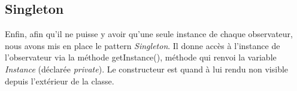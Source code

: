 \subsection{Singleton}

Enfin, afin qu’il ne puisse y avoir qu'une seule instance de chaque observateur, nous avons mis en place le pattern \emph{Singleton}. Il donne accès à l'instance de l'observateur via la méthode getInstance(), méthode qui renvoi la variable \emph{Instance} (déclarée \emph{private}). Le constructeur est quand à lui rendu non visible depuis l'extérieur de la classe.
